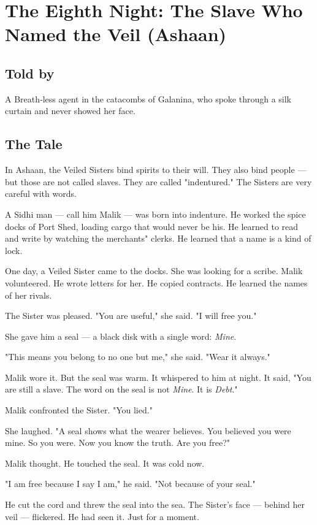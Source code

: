 \documentclass[10pt,twoside]{book}
\begin{document}
\chapter{The Eighth Night: The Slave Who Named the Veil (Ashaan)}

\section*{Told by}
A Breath‑less agent in the catacombs of Galanina, who spoke through a silk curtain and never showed her face.

\section*{The Tale}
In Ashaan, the Veiled Sisters bind spirits to their will. They also bind people --- but those are not called slaves. They are called "indentured." The Sisters are very careful with words.

A Sidhi man --- call him Malik --- was born into indenture. He worked the spice docks of Port Shed, loading cargo that would never be his. He learned to read and write by watching the merchants" clerks. He learned that a name is a kind of lock.

One day, a Veiled Sister came to the docks. She was looking for a scribe. Malik volunteered. He wrote letters for her. He copied contracts. He learned the names of her rivals.

The Sister was pleased. "You are useful," she said. "I will free you."

She gave him a seal --- a black disk with a single word: \textit{Mine}.

"This means you belong to no one but me," she said. "Wear it always."

Malik wore it. But the seal was warm. It whispered to him at night. It said, "You are still a slave. The word on the seal is not \textit{Mine}. It is \textit{Debt}."

Malik confronted the Sister. "You lied."

She laughed. "A seal shows what the wearer believes. You believed you were mine. So you were. Now you know the truth. Are you free?"

Malik thought. He touched the seal. It was cold now.

"I am free because I say I am," he said. "Not because of your seal."

He cut the cord and threw the seal into the sea. The Sister's face --- behind her veil --- flickered. He had seen it. Just for a moment.
\end{document}
